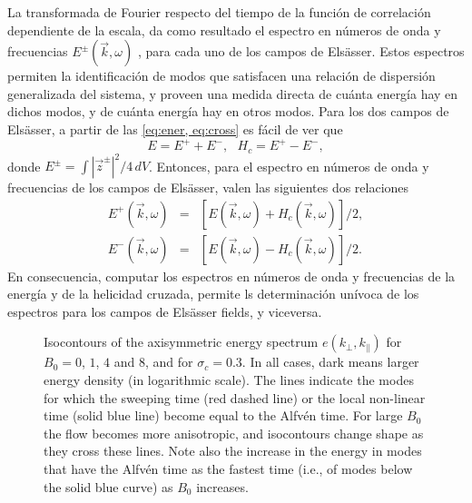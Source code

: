 La transformada de Fourier respecto del tiempo de la función de
correlación dependiente de la escala, da como resultado el espectro en
números de onda y frecuencias $E^\pm(\vec{k},\omega)$
\cite{clark_di_leoni_quantification_2014,
  clark_di_leoni_spatio-temporal_2015}, para cada uno de los campos de
Els\"asser. Estos espectros permiten la identificación de modos que
satisfacen una relación de dispersión generalizada del sistema, y
proveen una medida directa de cuánta energía hay en dichos modos, y de
cuánta energía hay en otros modos. Para los dos campos de Els\"asser,
a partir de las \cref{eq:ener, eq:cross} es fácil de ver que
\begin{equation}
  E = E^+ + E^- , \,\,\,\, H_c = E^+ - E^- ,
\end{equation}
donde $E^\pm = \int |\vec{z}^\pm|^2/4 \, dV$. Entonces, para el
espectro en números de onda y frecuencias de los campos de Els\"asser,
valen las siguientes dos relaciones
\begin{eqnarray}
  E^+(\vec{k},\omega) &=& [E(\vec{k},\omega) + H_c(\vec{k},\omega)]/2, \\
  E^-(\vec{k},\omega) &=& [E(\vec{k},\omega) - H_c(\vec{k},\omega)]/2.
\end{eqnarray}
En consecuencia, computar los espectros en números de onda y
frecuencias de la energía y de la helicidad cruzada, permite ls
determinación unívoca de los espectros para los campos de Els\"asser
fields, y viceversa.

\begin{figure*}
  \centering
  \caption{Isocontours of the axisymmetric energy spectrum
    $e(k_\perp,k_\parallel)$ for $B_0=0$, $1$, $4$ and $8$, and for
    $\sigma_c = 0.3$. In all cases, dark means larger energy density (in
    logarithmic scale). The lines indicate the modes for which the
    sweeping time (red dashed line) or the local non-linear time
    (solid blue line) become equal to the Alfv\'en time. For large
    $B_0$ the flow becomes more anisotropic, and isocontours change
    shape as they cross these lines. Note also the increase in the
    energy in modes that have the Alfv\'en time as the fastest time
    (i.e., of modes below the solid blue curve) as $B_0$ increases.}
  \label{fig2:isocontourns}
\end{figure*}

